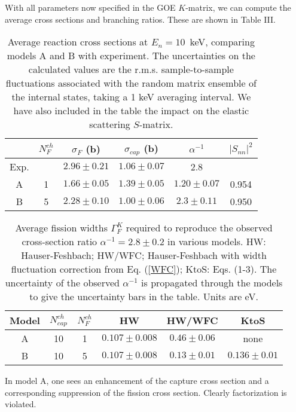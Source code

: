 \documentclass[prl,aps,floatfix,nofootinbib,preprint]{revtex4}
\begin{document}
With all parameters now specified in the GOE $K$-matrix, we can 
compute the average cross sections and branching ratios.  These are
shown in Table III.  
%
\begin{table}[htb] 
\caption{
Average reaction cross sections at $E_n = 10$~keV, comparing models A
and B with experiment.  The uncertainties on the calculated values are
the r.m.s. sample-to-sample fluctuations associated with the random matrix
ensemble of the internal states, taking a 1 keV averaging interval.
We have also included in the table the impact on the elastic scattering 
$S$-matrix.
}
\label{results}
\begin{center} 
\begin{tabular}{|c|ccccc|} 
\hline 
 & $N^{ch}_F$  &  $\sigma_F$ (b)  &  $\sigma_{cap}$ (b)  & $\alpha^{-1}$ & $|S_{nn}|^2$  \\ 
\hline
 Exp.  &  & $2.96\pm 0.21$   & $1.06\pm0.07$  & 2.8 &    \\
  A    &  1 & $1.66\pm0.05$ & $1.39\pm0.05$ & $1.20\pm0.07$ & 0.954 \\
  B    &  5 & $2.28\pm0.10$ & $1.00\pm0.06$ & $2.3\pm0.11$ & 0.950 \\
\hline 
\end{tabular} 
\end{center} 
\end{table} 
%
\begin{table}[htb] 
\caption{
Average fission widths $\Gamma^K_F$ required to reproduce the observed cross-section
ratio $\alpha^{-1} = 2.8\pm0.2$ in various models.  HW:  Hauser-Feshbach;
HW/WFC;  Hauser-Feshbach with width fluctuation correction from Eq.
(\ref{WFC}); KtoS:  Eqs. (1-3).  The uncertainty of the observed
$\alpha^{-1}$ is propagated through the models to give the uncertainty
bars in the table.  Units are eV.
}
\label{models}
\begin{center} 
\begin{tabular}{|ccc|ccc|} 
\hline 
 Model & $N^{ch}_{cap}$  &  $N^{ch}_F$ &    HW  &  HW/WFC  & KtoS  \\ 
\hline
A & 10 & 1 & $0.107\pm0.008$ & $0.46\pm0.06$ &  none \\
B & 10 & 5 & $0.107\pm0.008$ & $0.13\pm0.01$ &  $0.136\pm0.01$\\
\hline 
\end{tabular} 
\end{center} 
\end{table} 
%
In model A, one sees an enhancement of the capture cross section and
a corresponding suppression of the fission cross section.  Clearly
factorization is violated.
\end{document}
